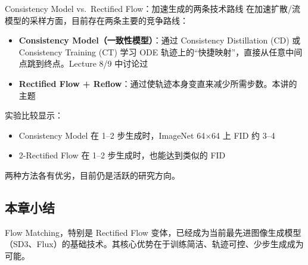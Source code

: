 \begin{knowledgebox}{Consistency Model vs.\ Rectified Flow：加速生成的两条技术路线}
在加速扩散/流模型的采样方面，目前存在两条主要的竞争路线：
\begin{itemize}
    \item \textbf{Consistency Model（一致性模型）}：通过 Consistency Distillation (CD) 或 Consistency Training (CT) 学习 ODE 轨迹上的``快捷映射''，直接从任意中间点跳到终点。Lecture 8/9 中讨论过
    \item \textbf{Rectified Flow + Reflow}：通过使轨迹本身变直来减少所需步数。本讲的主题
\end{itemize}

实验比较显示：
\begin{itemize}
    \item Consistency Model 在 1--2 步生成时，ImageNet 64$\times$64 上 FID 约 3--4
    \item 2-Rectified Flow 在 1--2 步生成时，也能达到类似的 FID
\end{itemize}
两种方法各有优劣，目前仍是活跃的研究方向。
\end{knowledgebox}

\subsection{本章小结}

Flow Matching，特别是 Rectified Flow 变体，已经成为当前最先进图像生成模型（SD3、Flux）的基础技术。其核心优势在于训练简洁、轨迹可控、少步生成成为可能。

